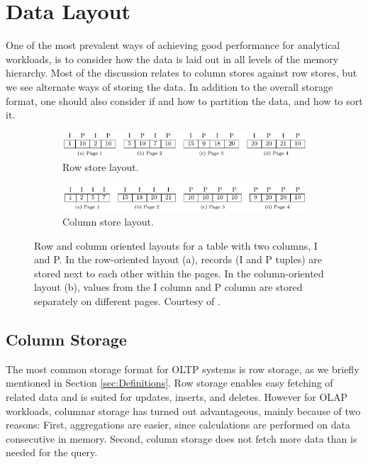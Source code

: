 \chapter{Data Layout}
\label{chap:Data Layout}
One of the most prevalent ways of achieving good performance for analytical workloads, is to consider how the data is laid out in all levels of the memory hierarchy. Most of the discussion relates to column stores against row stores, but we see alternate ways of storing the data. In addition to the overall storage format, one should also consider if and how to partition the data, and how to sort it.
\newpage

\begin{figure}
  \centering
  \begin{subfigure}{\textwidth}
    \includegraphics[width=\textwidth]{img/row-store.png}
    \caption{Row store layout.}
    \label{fig:row-column-store-1} 
  \end{subfigure}
  \begin{subfigure}{\textwidth}
    \includegraphics[width=\textwidth]{img/column-store.png}
    \caption{Column store layout.}
    \label{fig:row-column-store-2} 
  \end{subfigure}
  \caption{Row and column oriented layouts for a table with two columns, I and P. In the row-oriented layout (a), records (I and P tuples) are stored next to each other within the pages. In the column-oriented layout (b), values from the I column and P column are stored separately on different pages. Courtesy of \cite{Bjorklund2011-wh}.}
  \label{fig:row-column-store} 
\end{figure}
\section{Column Storage}
\label{sec:Column Storage}


The most common storage format for OLTP systems is row storage, as we briefly mentioned in Section \ref{sec:Definitions}. Row storage enables easy fetching of related data  and is suited for updates, inserts, and deletes. However for OLAP workloads, columnar storage has turned out advantageous, mainly because of two reasons: First, aggregations are easier, since calculations are performed on data consecutive in memory. Second, column storage does not fetch more data than is needed for the query.

